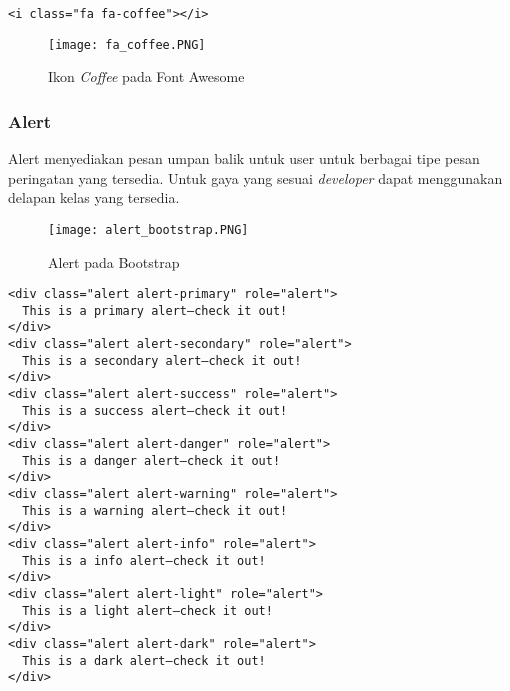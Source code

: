 \begin{lstlisting}[frame=single]
<i class="fa fa-coffee"></i>
\end{lstlisting}

\begin{figure} [H]
	\centering  
	\texttt{[image: fa\_coffee.PNG]}  
	\caption{Ikon \textit{Coffee} pada Font Awesome} 
\end{figure}
\subsubsection{Alert}
Alert menyediakan pesan umpan balik untuk user untuk berbagai tipe pesan peringatan yang tersedia. Untuk gaya yang sesuai \textit{developer} dapat menggunakan delapan kelas yang tersedia.
\begin{figure} [H]
	\centering  
	\texttt{[image: alert\_bootstrap.PNG]}  
	\caption{Alert pada Bootstrap} 
\end{figure}
\begin{lstlisting}[frame=single] 
<div class="alert alert-primary" role="alert">
  This is a primary alert—check it out!
</div>
<div class="alert alert-secondary" role="alert">
  This is a secondary alert—check it out!
</div>
<div class="alert alert-success" role="alert">
  This is a success alert—check it out!
</div>
<div class="alert alert-danger" role="alert">
  This is a danger alert—check it out!
</div>
<div class="alert alert-warning" role="alert">
  This is a warning alert—check it out!
</div>
<div class="alert alert-info" role="alert">
  This is a info alert—check it out!
</div>
<div class="alert alert-light" role="alert">
  This is a light alert—check it out!
</div>
<div class="alert alert-dark" role="alert">
  This is a dark alert—check it out!
</div>
\end{lstlisting}


 

 
